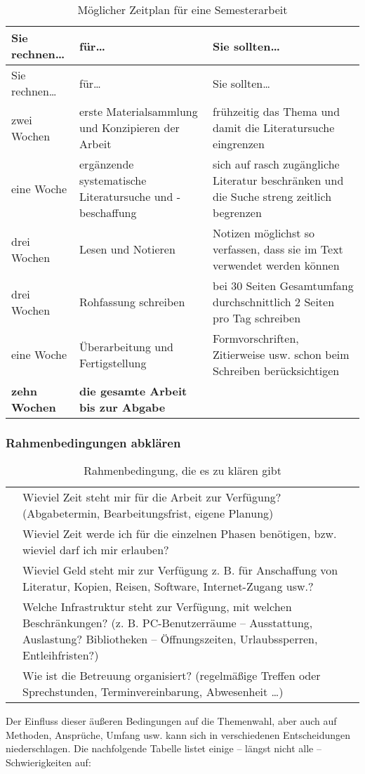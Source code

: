 \documentclass[]{article}
\begin{document}
\begin{longtable}[]{@{}lll@{}}
\caption{\label{tab:unnamed-chunk-4}Möglicher Zeitplan für eine
Semesterarbeit}\tabularnewline
\toprule
Sie rechnen\ldots{} & für\ldots{} & Sie sollten\ldots{}\tabularnewline
\midrule
\endfirsthead
\toprule
Sie rechnen\ldots{} & für\ldots{} & Sie sollten\ldots{}\tabularnewline
\midrule
\endhead
zwei Wochen & erste Materialsammlung und Konzipieren der Arbeit &
frühzeitig das Thema und damit die Literatursuche
eingrenzen\tabularnewline
eine Woche & ergänzende systematische Literatursuche und -beschaffung &
sich auf rasch zugängliche Literatur beschränken und die Suche streng
zeitlich begrenzen\tabularnewline
drei Wochen & Lesen und Notieren & Notizen möglichst so verfassen, dass
sie im Text verwendet werden können\tabularnewline
drei Wochen & Rohfassung schreiben & bei 30 Seiten Gesamtumfang
durchschnittlich 2 Seiten pro Tag schreiben\tabularnewline
eine Woche & Überarbeitung und Fertigstellung & Formvorschriften,
Zitierweise usw. schon beim Schreiben berücksichtigen\tabularnewline
\textbf{zehn Wochen} & \textbf{die gesamte Arbeit bis zur Abgabe}
&\tabularnewline
\bottomrule
\end{longtable}

\subsubsection{Rahmenbedingungen
abklären}\label{rahmenbedingungen-abklaren}

\begin{longtable}[]{@{}ll@{}}
\caption{\label{tab:unnamed-chunk-5}Rahmenbedingung, die es zu klären
gibt}\tabularnewline
\toprule
& Wieviel Zeit steht mir für die Arbeit zur Verfügung? (Abgabetermin,
Bearbeitungsfrist, eigene Planung)\tabularnewline
& Wieviel Zeit werde ich für die einzelnen Phasen benötigen, bzw.
wieviel darf ich mir erlauben?\tabularnewline
& Wieviel Geld steht mir zur Verfügung z. B. für Anschaffung von
Literatur, Kopien, Reisen, Software, Internet-Zugang
usw.?\tabularnewline
& Welche Infrastruktur steht zur Verfügung, mit welchen Beschränkungen?
(z. B. PC-Benutzerräume -- Ausstattung, Auslastung? Bibliotheken --
Öffnungszeiten, Urlaubssperren, Entleihfristen?)\tabularnewline
& Wie ist die Betreuung organisiert? (regelmäßige Treffen oder
Sprechstunden, Terminvereinbarung, Abwesenheit \ldots{})\tabularnewline
\bottomrule
\end{longtable}

Der Einfluss dieser äußeren Bedingungen auf die Themenwahl, aber auch
auf Methoden, Ansprüche, Umfang usw. kann sich in verschiedenen
Entscheidungen niederschlagen. Die nachfolgende Tabelle listet einige --
längst nicht alle -- Schwierigkeiten auf:
\end{document}
